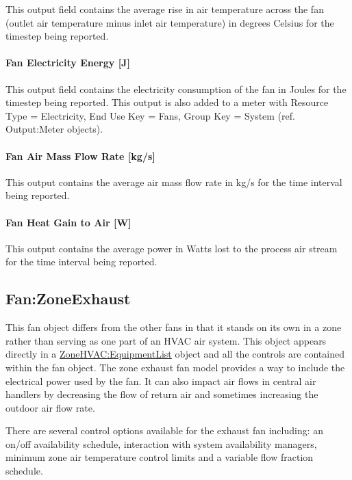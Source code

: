 This output field contains the average rise in air temperature across the fan (outlet air temperature minus inlet air temperature) in degrees Celsius for the timestep being reported.

\paragraph{Fan Electricity Energy {[}J{]}}\label{fan-electric-energy-j-2}

This output field contains the electricity consumption of the fan in Joules for the timestep being reported. This output is also added to a meter with Resource Type = Electricity, End Use Key = Fans, Group Key = System (ref. Output:Meter objects).

\paragraph{Fan Air Mass Flow Rate {[}kg/s{]}}\label{fan-air-mass-flow-kgs-2}

This output contains the average air mass flow rate in kg/s for the time interval being reported.

\paragraph{Fan Heat Gain to Air {[}W{]}}\label{fan-heat-gain-to-air-w-2}

This output contains the average power in Watts lost to the process air stream for the time interval being reported.

\subsection{Fan:ZoneExhaust}\label{fanzoneexhaust}

This fan object differs from the other fans in that it stands on its own in a zone rather than serving as one part of an HVAC air system. This object appears directly in a \hyperref[zonehvacequipmentlist]{ZoneHVAC:EquipmentList} object and all the controls are contained within the fan object. The zone exhaust fan model provides a way to include the electrical power used by the fan. It can also impact air flows in central air handlers by decreasing the flow of return air and sometimes increasing the outdoor air flow rate.

There are several control options available for the exhaust fan including: an on/off availability schedule, interaction with system availability managers, minimum zone air temperature control limits and a variable flow fraction schedule.

